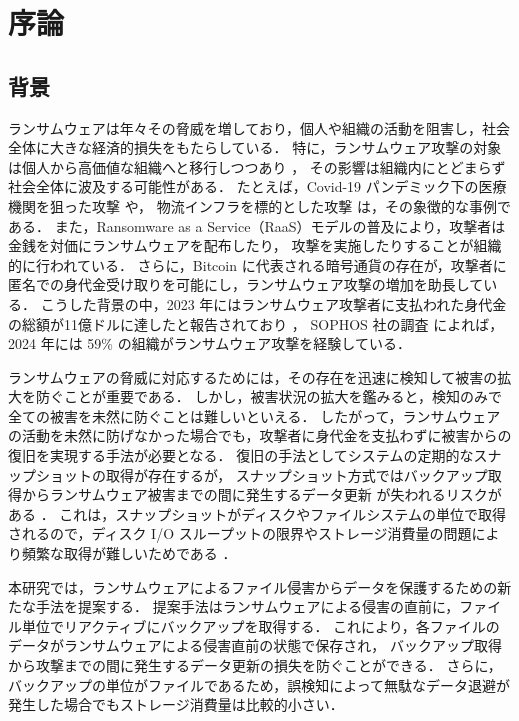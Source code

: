 \chapter{序論}
\section{背景}
ランサムウェアは年々その脅威を増しており，個人や組織の活動を阻害し，社会全体に大きな経済的損失をもたらしている．
特に，ランサムウェア攻撃の対象は個人から高価値な組織へと移行しつつあり \cite{sophos-report:online,early-detection}，
その影響は組織内にとどまらず社会全体に波及する可能性がある．
たとえば，Covid-19 パンデミック下の医療機関を狙った攻撃 \cite{Covid19R19:online} や，
物流インフラを標的とした攻撃 \cite{nagoya-port-attack} は，その象徴的な事例である．
また，Ransomware as a Service（RaaS）モデルの普及により，攻撃者は金銭を対価にランサムウェアを配布したり，
攻撃を実施したりすることが組織的に行われている．
さらに，Bitcoin に代表される暗号通貨の存在が，攻撃者に匿名での身代金受け取りを可能にし，ランサムウェア攻撃の増加を助長している．
こうした背景の中，2023 年にはランサムウェア攻撃者に支払われた身代金の総額が11億ドルに達したと報告されており \cite{Ransomwa86:online}，
SOPHOS 社の調査 \cite{sophos-report:online} によれば，2024 年には 59\% の組織がランサムウェア攻撃を経験している．

ランサムウェアの脅威に対応するためには，その存在を迅速に検知して被害の拡大を防ぐことが重要である．
しかし，被害状況の拡大を鑑みると，検知のみで全ての被害を未然に防ぐことは難しいといえる．
したがって，ランサムウェアの活動を未然に防げなかった場合でも，攻撃者に身代金を支払わずに被害からの復旧を実現する手法が必要となる．
復旧の手法としてシステムの定期的なスナップショットの取得が存在するが，
スナップショット方式ではバックアップ取得からランサムウェア被害までの間に発生するデータ更新
が失われるリスクがある \cite{wang2024ransom}．
これは，スナップショットがディスクやファイルシステムの単位で取得されるので，ディスク I/O スループットの限界やストレージ消費量の問題により頻繁な取得が難しいためである
\cite{wang2024ransom, veena2021incremental}．

本研究では，ランサムウェアによるファイル侵害からデータを保護するための新たな手法を提案する．
提案手法はランサムウェアによる侵害の直前に，ファイル単位でリアクティブにバックアップを取得する．
これにより，各ファイルのデータがランサムウェアによる侵害直前の状態で保存され，
バックアップ取得から攻撃までの間に発生するデータ更新の損失を防ぐことができる．
さらに，バックアップの単位がファイルであるため，誤検知によって無駄なデータ退避が発生した場合でもストレージ消費量は比較的小さい．
